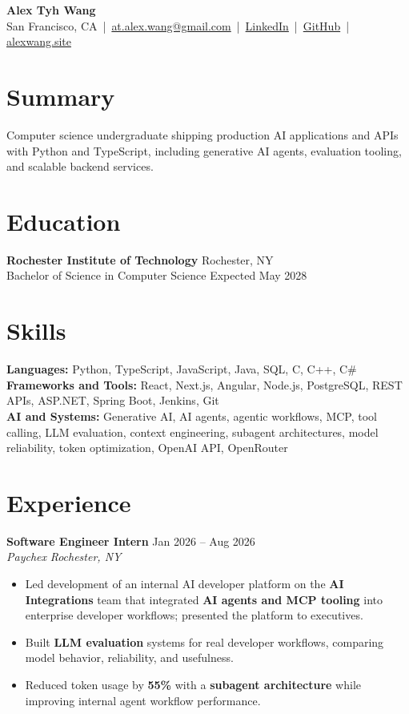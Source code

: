 \documentclass[10pt,letterpaper]{article}
\newif\ifresumeFirstRole
\newcommand{\resumeRole}[4]{%
  \ifresumeFirstRole
    \global\resumeFirstRolefalse
  \else
    \vspace{0pt plus 1fill}%
  \fi
  \textbf{#1} \hfill #2\\
  \textit{#3} \hfill \textit{#4}
}
\begin{document}
\begin{center}
{\Large \textbf{Alex Tyh Wang}}\\
San Francisco, CA \,|\, \href{mailto:at.alex.wang@gmail.com}{at.alex.wang@gmail.com} \,|\, \href{https://www.linkedin.com/in/alex-tyh-wang/}{LinkedIn} \,|\, \href{https://github.com/alextyhwang}{GitHub} \,|\, \href{https://alexwang.site}{alexwang.site}
\end{center}

\section*{Summary}
Computer science undergraduate shipping production AI applications and APIs with Python and TypeScript, including generative AI agents, evaluation tooling, and scalable backend services.

\section*{Education}
\textbf{Rochester Institute of Technology} \hfill Rochester, NY\\
Bachelor of Science in Computer Science \hfill Expected May 2028

\section*{Skills}
\textbf{Languages:} Python, TypeScript, JavaScript, Java, SQL, C, C++, C\#\\
\textbf{Frameworks and Tools:} React, Next.js, Angular, Node.js, PostgreSQL, REST APIs, ASP.NET, Spring Boot, Jenkins, Git\\
\textbf{AI and Systems:} Generative AI, AI agents, agentic workflows, MCP, tool calling, LLM evaluation, context engineering, subagent architectures, model reliability, token optimization, OpenAI API, OpenRouter

\section*{Experience}
\resumeRole{Software Engineer Intern}{Jan 2026 -- Aug 2026}{Paychex}{Rochester, NY}
\begin{itemize}
  \item Led development of an internal AI developer platform on the \textbf{AI Integrations} team that integrated \textbf{AI agents and MCP tooling} into enterprise developer workflows; presented the platform to executives.
  \item Built \textbf{LLM evaluation} systems for real developer workflows, comparing model behavior, reliability, and usefulness.
  \item Reduced token usage by \textbf{55\%} with a \textbf{subagent architecture} while improving internal agent workflow performance.
\end{itemize}
\end{document}
